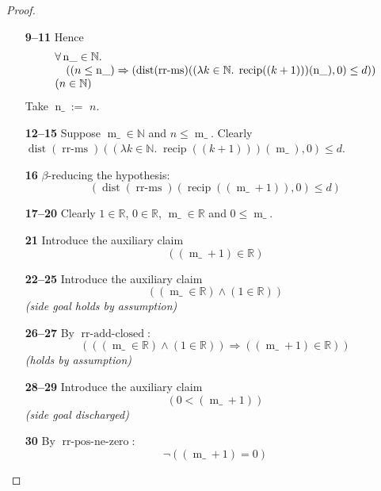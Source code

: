 \documentclass[11pt]{article}
\theoremstyle{plain}
\begin{document}
\begin{proof}
\begin{itemize}[leftmargin=2.8em, itemsep=4pt, parsep=1pt]
  \item[\textbf{9--11}] Hence 
\begin{equation*}
\begin{array}{@{}l@{}}
\begin{array}{@{}l@{}} \forall \operatorname{n\_} \in \mathbb{N}. \\ \quad ((n \leq \operatorname{n\_}) \Rightarrow (\operatorname{dist}(\operatorname{rr\text{-}ms})((\lambda k \in \mathbb{N}.\; \operatorname{recip}((k + 1)))(\operatorname{n\_}), 0) \leq d)) \end{array} \\
(n \in \mathbb{N})
\end{array}
\end{equation*}
Take $\operatorname{n\_} :=$ $n$.
  \item[\textbf{12--15}] Suppose $\operatorname{m\_} \in \mathbb{N}$ and $n \leq \operatorname{m\_}$. Clearly $\operatorname{dist}(\operatorname{rr\text{-}ms})((\lambda k \in \mathbb{N}.\; \operatorname{recip}((k + 1)))(\operatorname{m\_}), 0) \leq d$.
  \item[\textbf{16}] $\beta$-reducing the hypothesis:
\begin{equation*}
(\operatorname{dist}(\operatorname{rr\text{-}ms})(\operatorname{recip}((\operatorname{m\_} + 1)), 0) \leq d)
\end{equation*}

  \item[\textbf{17--20}] Clearly $1 \in \mathbb{R}$, $0 \in \mathbb{R}$, $\operatorname{m\_} \in \mathbb{R}$ and $0 \leq \operatorname{m\_}$.
  \item[\textbf{21}] Introduce the auxiliary claim
\begin{equation*}
((\operatorname{m\_} + 1) \in \mathbb{R})
\end{equation*}

  \item[\textbf{22--25}] Introduce the auxiliary claim
\begin{equation*}
((\operatorname{m\_} \in \mathbb{R}) \wedge (1 \in \mathbb{R}))
\end{equation*}
  \emph{(side goal holds by assumption)}
  \item[\textbf{26--27}] By $\operatorname{rr\text{-}add\text{-}closed}$:
\begin{equation*}
(((\operatorname{m\_} \in \mathbb{R}) \wedge (1 \in \mathbb{R})) \Rightarrow ((\operatorname{m\_} + 1) \in \mathbb{R}))
\end{equation*}
  \emph{(holds by assumption)}
  \item[\textbf{28--29}] Introduce the auxiliary claim
\begin{equation*}
(0 < (\operatorname{m\_} + 1))
\end{equation*}
  \emph{(side goal discharged)}
  \item[\textbf{30}] By $\operatorname{rr\text{-}pos\text{-}ne\text{-}zero}$:
\begin{equation*}
\neg ((\operatorname{m\_} + 1) = 0)
\end{equation*}


\end{itemize}
\end{proof}
\end{document}
